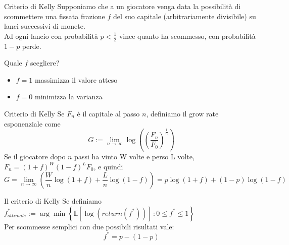 \documentclass{beamer}
\newcommand{\1}{\mathbbm{1}}
\begin{document}
\begin{frame}{Criterio di Kelly}
Supponiamo che a un giocatore venga data la possibilità di scommettere una fissata frazione $f$ del suo capitale (arbitrariamente divisibile) su lanci successivi di monete.\\
Ad ogni lancio con probabilità $p<\frac{1}{2}$ vince quanto ha scommesso, con probabilità $1-p$ perde.
\vspace{15pt}

Quale $f$ scegliere?
\begin{itemize}
\item $f=1$ massimizza il valore atteso
\item $f=0$ minimizza la varianza
\end{itemize}
\end{frame}

\begin{frame}{Criterio di Kelly}
Se $F_n$ è il capitale al passo $n$, definiamo il grow rate esponenziale come
\[
G:=\lim_{n\to\infty}\log
\left(\left(
\frac{F_n}{F_0}\right)^{\frac{1}{n}}\right)
\]
Se il giocatore dopo $n$ passi ha vinto W volte e perso L volte, $F_n=(1+f)^W(1-f)^LF_0$, e quindi
\[
G =
\lim_{n\to\infty}
\left(
	\frac{W}{n}\log(1+f)+
	\frac{L}{n}\log(1-f)
\right)
=
p\log(1+f) + (1-p) \log(1-f)
\]
\begin{block}{Il criterio di Kelly}
Se definiamo $f^*_{ottimale} := \arg\min \left\{\mathbb{E}[\log(return(f^*))] \,:0\leq f^*\leq1 \right\} $ \\
\vspace{5pt}
Per scommesse semplici con due possibili risultati vale:
\[ f^*= p-(1-p) \]
\end{block}
\end{frame}
\end{document}
